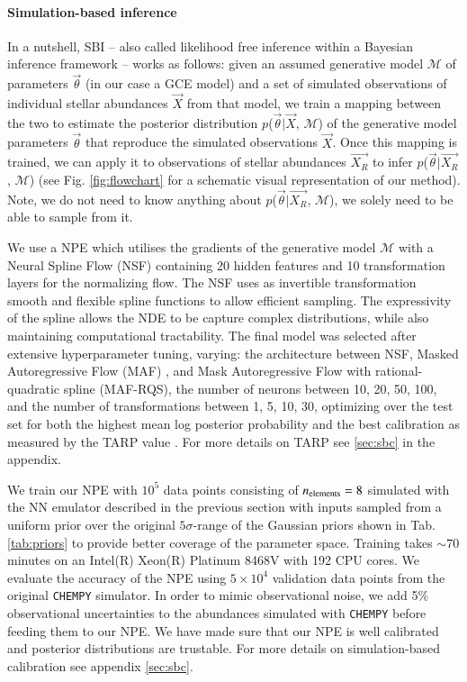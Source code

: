 \documentclass{aa}
\begin{document}
\paragraph{Simulation-based inference}
In a nutshell, SBI \citep[e.g.][]{Cranmer2020,Papamakarios:2021,Gloeckler2024AllinoneSI} -- also called likelihood free inference within a Bayesian inference framework -- works as follows: given an assumed generative model $\mathcal{M}$ of parameters $\Vec{\theta}$ (in our case a GCE model) and a set of simulated observations of individual stellar abundances $\Vec{X}$ from that model, we train a mapping between the two to estimate the posterior distribution $p$($\Vec{\theta}|\Vec{X}$, $\mathcal{M}$) of the generative model parameters $\Vec{\theta}$ that reproduce the simulated observations $\Vec{X}$. Once this mapping is trained, we can apply it to observations of stellar abundances $\Vec{X_R}$ to infer $p$($\Vec{\theta}|\Vec{X_R}$, $\mathcal{M}$) (see Fig. \ref{fig:flowchart} for a schematic visual representation of our method). Note, we do not need to know anything about $p$($\Vec{\theta}|\Vec{X_R}$, $\mathcal{M}$), we solely need to be able to sample from it.

We use a NPE \cite{zeghal2022neuralposteriorestimationdifferentiable} which utilises the gradients of the generative model $\mathcal{M}$ with a Neural Spline Flow (NSF) \citet{durkan2019neuralsplineflows} containing 20 hidden features and 10 transformation layers for the normalizing flow. The NSF uses as invertible transformation smooth and flexible spline functions to allow efficient sampling. The expressivity of the spline allows the NDE to be capture complex distributions, while also maintaining computational tractability. The final model was selected after extensive hyperparameter tuning, varying: the architecture between NSF, Masked Autoregressive Flow (MAF) \cite{papamakarios2018maskedautoregressiveflowdensity}, and Mask Autoregressive 
Flow with rational-quadratic spline (MAF-RQS), the number of neurons between {10, 20, 50, 100}, and the number of transformations between {1, 5, 10, 30}, optimizing over the test set for both the highest mean log posterior probability and the best calibration as measured by the TARP value \citep{Lemos2023}. For more details on TARP see \ref{sec:sbc} in the appendix.

We train our NPE with $10^5$ data points consisting of $n_{\rm elements}=8$ simulated with the NN emulator described in the previous section with inputs sampled from a uniform prior over the original $5\sigma$-range of the Gaussian priors shown in Tab. \ref{tab:priors} to provide better coverage of the parameter space. Training takes $\sim70$ minutes on an Intel(R) Xeon(R) Platinum 8468V with 192 CPU cores. 
We evaluate the accuracy of the NPE using $5\times10^4$ validation data points from the original \texttt{CHEMPY} simulator. In order to mimic observational noise, we add 5\% observational uncertainties to the abundances simulated with \texttt{CHEMPY} before feeding them to our NPE.
We have made sure that our NPE is well calibrated and posterior distributions are trustable. For more details on simulation-based calibration see appendix \ref{sec:sbc}.
\end{document}
